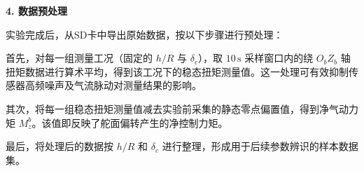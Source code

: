 \textbf{4. 数据预处理}

实验完成后，从SD卡中导出原始数据，按以下步骤进行预处理：

首先，对每一组测量工况（固定的 $h/R$ 与 $\delta_c$），取 $10\,\mathrm{s}$ 采样窗口内的绕 $O_bZ_b$ 轴扭矩数据进行算术平均，得到该工况下的稳态扭矩测量值。这一处理可有效抑制传感器高频噪声及气流脉动对测量结果的影响。

其次，将每一组稳态扭矩测量值减去实验前采集的静态零点偏置值，得到净气动力矩 $M_{z}^b$。该值即反映了舵面偏转产生的净控制力矩。

最后，将处理后的数据按 $h/R$ 和 $\delta_c$ 进行整理，形成用于后续参数辨识的样本数据集。






